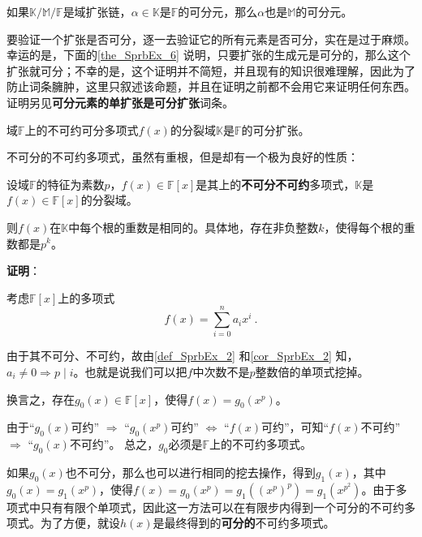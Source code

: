 \begin{lemma}{}\label{lem_SprbEx_3}
如果$\mathbb{K}/\mathbb{M}/\mathbb{F}$是域扩张链，$\alpha\in\mathbb{K}$是$\mathbb{F}$的可分元，那么$\alpha$也是$\mathbb{M}$的可分元。
\end{lemma}


要验证一个扩张是否可分，逐一去验证它的所有元素是否可分，实在是过于麻烦。幸运的是，下面的\autoref{the_SprbEx_6} 说明，只要扩张的生成元是可分的，那么这个扩张就可分；不幸的是，这个证明并不简短，并且现有的知识很难理解，因此为了防止词条臃肿，这里只叙述该命题，并且在证明之前都不会用它来证明任何东西。证明另见\textbf{可分元素的单扩张是可分扩张}词条。

\begin{theorem}{}\label{the_SprbEx_6}
域$\mathbb{F}$上的不可约可分多项式$f(x)$的分裂域$\mathbb{K}$是$\mathbb{F}$的可分扩张。
\end{theorem}



不可分的不可约多项式，虽然有重根，但是却有一个极为良好的性质：


\begin{theorem}{}\label{the_SprbEx_3}
设域$\mathbb{F}$的特征为素数$p$，$f(x)\in\mathbb{F}[x]$是其上的\textbf{不可分不可约}多项式，$\mathbb{K}$是$f(x)\in\mathbb{F}[x]$的分裂域。

则$f(x)$在$\mathbb{K}$中每个根的重数是相同的。具体地，存在非负整数$k$，使得每个根的重数都是$p^k$。
\end{theorem}

\textbf{证明}：

考虑$\mathbb{F}[x]$上的多项式
\begin{equation}
f(x) = \sum_{i=0}^n a_ix^i~.
\end{equation}


由于其不可分、不可约，故由\autoref{def_SprbEx_2} 和\autoref{cor_SprbEx_2} 知，$a_i\neq 0 \Rightarrow p\mid i$。也就是说我们可以把$f$中次数不是$p$整数倍的单项式挖掉。

换言之，存在$g_0(x)\in\mathbb{F}[x]$，使得$f(x)=g_0(x^p)$。

由于“$g_0(x)$可约” $\Rightarrow$ “$g_0(x^p)$可约” $\iff$ “$f(x)$可约”，可知“$f(x)$不可约” $\Rightarrow$ “$g_0(x)$不可约”。 总之，$g_0$必须是$\mathbb{F}$上的不可约多项式。

如果$g_0(x)$也不可分，那么也可以进行相同的挖去操作，得到$g_1(x)$，其中$g_0(x) = g_1(x^p)$，使得$f(x) = g_0(x^p) = g_1((x^p)^p) = g_1(x^{p^2})$。由于多项式中只有有限个单项式，因此这一方法可以在有限步内得到一个可分的不可约多项式。为了方便，就设$h(x)$是最终得到的\textbf{可分的}不可约多项式。

